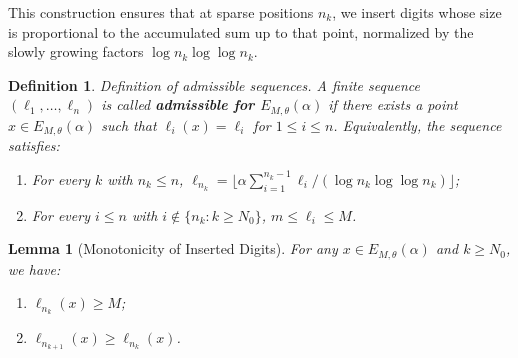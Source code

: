 \documentclass{article}
\newtheorem{lemma}[theorem]{Lemma}
\newtheorem{definition}[theorem]{Definition}
\numberwithin{equation}{section}
\begin{document}
This construction ensures that at sparse positions $n_k$, we insert digits whose size is proportional to the accumulated sum up to that point, normalized by the slowly growing factors $\log n_k \log \log n_k$.
{\begin{definition}
{Definition of admissible sequences.} A finite sequence $(\ell_1, \ldots, \ell_n)$ is called \textbf{admissible for $E_{M,\theta}(\alpha)$} if there exists a point $x \in E_{M,\theta}(\alpha)$ such that $\ell_i(x) = \ell_i$ for $1 \le i \le n$. Equivalently, the sequence satisfies:
\begin{enumerate}
    \item[(i)] For every $k$ with $n_k \leq n$, $\ell_{n_k} = \bigl\lfloor \alpha \sum_{i=1}^{n_k-1} \ell_i / (\log n_k \log \log n_k) \bigr\rfloor$;
    \item[(ii)] For every $i \leq n$ with $i \notin \{n_k: k \geq N_0\}$, $m \leq \ell_i \leq M$.
\end{enumerate}
\end{definition}}
\begin{lemma}[Monotonicity of Inserted Digits] \label{lem:monotonicity}
For any $x \in E_{M,\theta}(\alpha)$ and $k \geq N_0$, we have:
\begin{enumerate}
\item[(a)] $\ell_{n_k}(x) \geq M$;
\item[(b)] $\ell_{n_{k+1}}(x) \geq \ell_{n_k}(x)$.
\end{enumerate}
\end{lemma}
\end{document}
